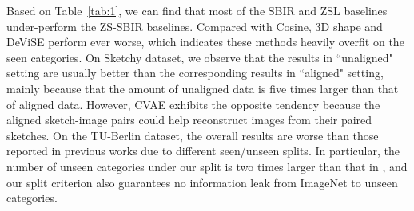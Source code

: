 \documentclass[10pt,twocolumn,letterpaper]{article}
\begin{document}

\begin{table}[]
\caption{Ablation Studies of our method on Sketchy dataset.}
\label{tab:2}
\vspace{-15pt}
\end{table}


Based on Table~\ref{tab:1}, we can find that most of the SBIR and ZSL baselines under-perform the ZS-SBIR baselines. 
Compared with Cosine, 3D shape \cite{wang2015sketch} and DeViSE \cite{frome2013devise} perform ever worse, which indicates these methods heavily overfit on the seen categories. 
On Sketchy dataset, we observe that the results in ``unaligned" setting are usually better than the corresponding results in ``aligned" setting, mainly because that the amount of unaligned data is five times larger than that of aligned data.
However, CVAE exhibits the opposite tendency because the aligned sketch-image pairs could help reconstruct images from their paired sketches. 
On the TU-Berlin dataset, the overall results are worse than those reported in previous works \cite{liu2019semantic, dutta2019semantically} due to different seen/unseen splits. 
In particular, the number of unseen categories under our split is two times larger than that in  \cite{liu2019semantic, dutta2019semantically}, and our split criterion also guarantees no information leak from ImageNet to unseen categories.
\end{document}
